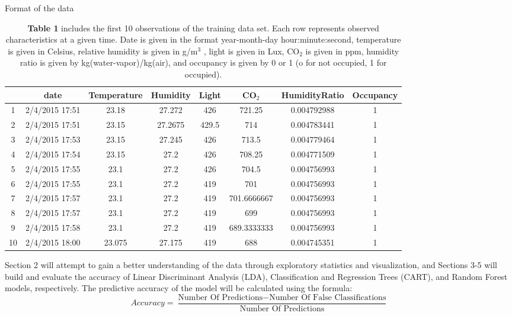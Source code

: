 \documentclass{article}
\begin{document}
\begin{table}[H]
	\centering
	\caption{Format of the data}
		\begin{tabular}{ c|c|c|c|c|c|c|c } 
 		 & date & Temperature & Humidity & Light & CO$_2$ & HumidityRatio & Occupancy \\
		\hline\hline
		1 & 2/4/2015 17:51 & 23.18 & 27.272 & 426 & 721.25 & 0.004792988 & 1 \\
		\hline
		2 & 2/4/2015 17:51 & 23.15 & 27.2675 & 429.5 & 714 & 0.004783441 & 1 \\
		\hline
 		3 & 2/4/2015 17:53 & 23.15 & 27.245 & 426 & 713.5 & 0.004779464 & 1 \\
		\hline
 		4 & 2/4/2015 17:54 & 23.15 & 27.2 & 426 & 708.25 & 0.004771509 & 1 \\
		\hline
		5 & 2/4/2015 17:55 & 23.1 & 27.2 & 426 & 704.5 & 0.004756993 & 1 \\
		\hline
 		6 & 2/4/2015 17:55 & 23.1 & 27.2 & 419 & 701 & 0.004756993 & 1 \\
		\hline
		7 & 2/4/2015 17:57 & 23.1 & 27.2 & 419 & 701.6666667 & 0.004756993 & 1 \\
		\hline
		8 & 2/4/2015 17:57 & 23.1 & 27.2 & 419 & 699 & 0.004756993 & 1 \\
		\hline
		9 & 2/4/2015 17:58 & 23.1 & 27.2 & 419 & 689.3333333 & 0.004756993 & 1 \\
		\hline
		10 & 2/4/2015 18:00 & 23.075 & 27.175 & 419 & 688 & 0.004745351 & 1 \\
		\end{tabular}
	\caption*{\textbf{Table 1} includes the first 10 observations of the training data set. Each row represents observed characteristics at a given time. Date is given in the format year-month-day hour:minute:second, temperature is given in Celsius, relative humidity is given in g/m$^3$ , light is given in Lux, CO$_2$ is given in ppm, humidity ratio is given by kg(water-vapor)/kg(air), and occupancy is given by 0 or 1 (o for not occupied, 1 for occupied).}
\end{table}

Section 2 will attempt to gain a better understanding of the data through exploratory statistics and visualization, and Sections 3-5 will build and evaluate the accuracy of Linear Discriminant Analysis (LDA), Classification and Regression Trees (CART),  and Random Forest models, respectively. The predictive accuracy of the model will be calculated using the formula:
$$Accuracy = \frac{\text{Number Of Predictions} - \text{Number Of False Classifications}}{\text{Number Of Predictions}}$$
\end{document}
